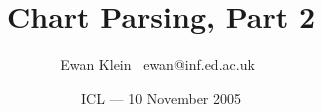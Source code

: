 % 
%
%
%
%
%
%
%
\title{Chart Parsing, Part 2}
\author{Ewan Klein \newline \mbox{ }ewan@inf.ed.ac.uk\mbox{ }}
\date{ICL --- 10 November 2005}



\newcommand{\Rule}{\rule{\textwidth}{1pt}}
\newcommand{\SqB}[1]{[#1]}

\newcommand{\bigdot}{\mbox{\begin{scriptsize}{\ensuremath{\bullet}}\end{scriptsize}}}

\newcommand{\chdot}{\bigdot}





\usepackage{color}
\usepackage{amsmath}
\usepackage{graphicx}
\usepackage[plain]{algorithm}
% 

\newcommand{\Hilite}[1]{\colorbox{yellow}{#1}}
\newcommand{\Shade}[1]{\colorbox{light}{#1}}

\newcommand{\Em}[1]{\textcolor{red}{#1}}
\newcommand{\Dim}[1]{\textcolor{gray}{#1}}

\setlength{\parskip}{0in}
\setlength{\parindent}{0in}

\def\tab{\hbox{\kern0.4in}}    %
\def\al{\\\tab}                %
\def\nl{\\\tab\tab}            %
\def\nnl{\\\tab\tab\tab}       %
\def\blob{$\diamondsuit\ \ $}  %
\def\mysum{\begin{Huge}\mbox{$\Sigma$}\end{Huge}}
\def\myprod{\begin{Huge}\mbox{$\Pi$}\end{Huge}}
\def\rarrow{$\rightarrow\ \ $}  %

